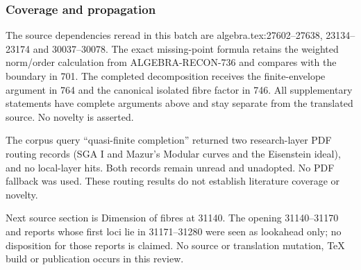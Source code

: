 \subsubsection{Coverage and propagation}\label{coverage-and-propagation}

The source dependencies reread in this batch are algebra.tex:27602--27638, 23134--23174 and 30037--30078. The exact missing-point formula retains the weighted norm/order calculation from ALGEBRA-RECON-736 and compares with the boundary in 701. The completed decomposition receives the finite-envelope argument in 764 and the canonical isolated fibre factor in 746. All supplementary statements have complete arguments above and stay separate from the translated source. No novelty is asserted.

The corpus query ``quasi-finite completion'' returned two research-layer PDF routing records (SGA I and Mazur's Modular curves and the Eisenstein ideal), and no local-layer hits. Both records remain unread and unadopted. No PDF fallback was used. These routing results do not establish literature coverage or novelty.

Next source section is Dimension of fibres at 31140. The opening 31140--31170 and reports whose first loci lie in 31171--31280 were seen as lookahead only; no disposition for those reports is claimed. No source or translation mutation, TeX build or publication occurs in this review.
